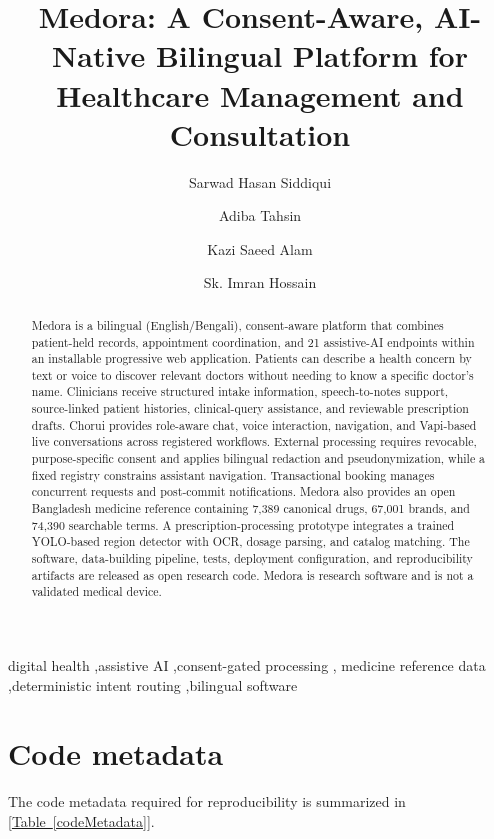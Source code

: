 \documentclass[preprint,12pt,a4paper]{elsarticle}
\begin{document}
\begin{frontmatter}

\title{Medora: A Consent-Aware, AI-Native Bilingual Platform for Healthcare Management and Consultation}

\author{Sarwad Hasan Siddiqui}
\author{Adiba Tahsin}
\author{Kazi Saeed Alam}
\author{Sk. Imran Hossain}
\address{Department of Computer Science and Engineering, Khulna University of Engineering \& Technology, Khulna 9203, Bangladesh}

\begin{abstract}
Medora is a bilingual (English/Bengali), consent-aware platform that combines patient-held records, appointment coordination, and 21 assistive-AI endpoints within an installable progressive web application. Patients can describe a health concern by text or voice to discover relevant doctors without needing to know a specific doctor’s name. Clinicians receive structured intake information, speech-to-notes support, source-linked patient histories, clinical-query assistance, and reviewable prescription drafts. Chorui provides role-aware chat, voice interaction, navigation, and Vapi-based live conversations across registered workflows. External processing requires revocable, purpose-specific consent and applies bilingual redaction and pseudonymization, while a fixed registry constrains assistant navigation. Transactional booking manages concurrent requests and post-commit notifications. Medora also provides an open Bangladesh medicine reference containing 7,389 canonical drugs, 67,001 brands, and 74,390 searchable terms. A prescription-processing prototype integrates a trained YOLO-based region detector with OCR, dosage parsing, and catalog matching. The software, data-building pipeline, tests, deployment configuration, and reproducibility artifacts are released as open research code. Medora is research software and is not a validated medical device.
\end{abstract}

\begin{keyword}
digital health \sep assistive AI \sep consent-gated processing \sep
medicine reference data \sep deterministic intent routing \sep bilingual software
\end{keyword}
\end{frontmatter}

\section*{Code metadata}
The code metadata required for reproducibility is summarized in [\hyperref[codeMetadata]{Table~\ref*{codeMetadata}}].
\end{document}
